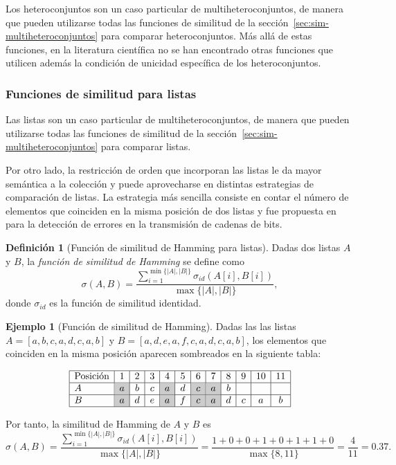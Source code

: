 \documentclass[a4paper,10pt,twoside]{article}
\theoremstyle{definition}
\newtheorem{definition}{Definición}
\newtheorem{example}{Ejemplo}
\begin{document}
Los heteroconjuntos son un caso particular de multiheteroconjuntos, de manera que pueden utilizarse todas las funciones de similitud de la sección~\ref{sec:sim-multiheteroconjuntos} para comparar heteroconjuntos.
Más allá de estas funciones, en la literatura científica no se han encontrado otras funciones que utilicen además la condición de unicidad específica de los heteroconjuntos.


\subsubsection{Funciones de similitud para listas}
\label{sec:sim-listas}

Las listas son un caso particular de multiheteroconjuntos, de manera que
pueden utilizarse todas las funciones de similitud de la sección~\ref{sec:sim-multiheteroconjuntos} para comparar listas. 

Por otro lado, la restricción de orden que incorporan las listas le da mayor semántica a la colección y puede aprovecharse en distintas estrategias de comparación de listas.
La estrategia más sencilla consiste en contar el número de elementos que coinciden en la misma posición de dos listas y fue propuesta en \cite{hamming1950errordetecting} para la detección de errores en la transmisión de cadenas de bits. 

\begin{definition}[Función de similitud de Hamming para listas]
Dadas dos listas $A$ y $B$, la \emph{función de similitud de Hamming} se define como
\[
\sigma(A,B)=\frac{\sum_{i=1}^{\min\{|A|,|B|\}}\sigma_{id}(A[i],B[i])}{\max\{|A|,|B|\}},
\]
donde $\sigma_{id}$ es la función de similitud identidad.
\end{definition}

\begin{example}[Función de similitud de Hamming]
Dadas las las listas $A=[a,b,c,a,d,c,a,b]$ y $B=[a,d,e,a,f,c,a,d,c,a,b]$, los elementos que coinciden en la misma posición aparecen sombreados en la siguiente tabla:

\[
\begin{array}{|l|c|c|c|c|c|c|c|c|c|c|c|}
\hline
\textrm{Posición} & 1 & 2 & 3 & 4 & 5 & 6 & 7 & 8 & 9 & 10 & 11\\
\hline
A & \cellcolor{gray!40}a & b & c & \cellcolor{gray!40}a & d & \cellcolor{gray!40}c & \cellcolor{gray!40}a & b & & & \\
\hline
B & \cellcolor{gray!40}a & d & e & \cellcolor{gray!40}a & f & \cellcolor{gray!40}c & \cellcolor{gray!40}a & d & c & a & b\\
\hline
\end{array}
\]

Por tanto, la similitud de Hamming de $A$ y $B$ es
\[
\sigma(A,B) = \frac{\sum_{i=1}^{\min\{|A|,|B|\}}\sigma_{id}(A[i],B[i])}{\max\{|A|,|B|\}} =
\frac{1+0+0+1+0+1+1+0}{\max\{8,11\}}=\frac{4}{11}=0.37.
\]
\end{example}
\end{document}
